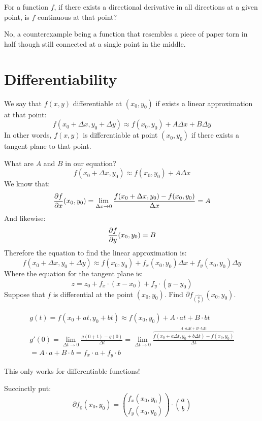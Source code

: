 \documentclass[00_complete]{subfiles}
\begin{document}
\begin{example}[Question 3]
    For a function $f$, if there exists a directional derivative in all
    directions at a given point, is $f$ continuous at that point?
    \begin{conclusion}
        No, a counterexample being a function that resembles a piece of paper
        torn in half though still connected at a single point in the middle.
    \end{conclusion}
\end{example}
\section{Differentiability}
\begin{definition}[Differentiability]
   We say that $f(x,y)$ differentiable at $(x_0,y_0)$ if exists a linear
   approximation at that point:
   $$f(x_0+\Delta x,y_0+\Delta y) \approx f(x_0,y_0)+A \Delta x + B \Delta y$$
   In other words, $f(x,y)$ is differentiable at point $(x_0,y_0)$ if there
   exists a tangent plane to that point.
\end{definition}
What are $A$ and $B$ in our equation?
$$f(x_0+\Delta x,y_0) \approx f(x_0,y_0) + A\Delta x$$
We know that:
$$\pdv{f}{x}\/(x_0,y_0) = \lim\limits_{\Delta x \to 0} \frac{f(x_0+\Delta
x,y_0)-f(x_0,y_0)}{\Delta x} =A$$
And likewise:
$$\pdv{f}{y}\/(x_0,y_0) = B$$
Therefore the equation to find the linear approximation is:
$$
    f(x_0+\Delta x,y_0 + \Delta y) \approx f(x_0,y_0) + f_x(x_0,y_0)\Delta x +
    f_y(x_0,y_0)\Delta y
$$
Where the equation for the tangent plane is:
$$
    z=z_0+f_x\cdot (x-x_0)+f_y \cdot (y-y_0)
$$
Suppose that $f$ is differential at the point $(x_0,y_0)$. Find $\partial
f_{\hat{\underline{\binom{a}{b}}}}(x_0,y_0)$.

\begin{gather*}
    g(t)=f(x_0+at,y_0+bt) \approx f(x_0,y_0) + A\cdot at + B \cdot bt \\
    g'(0) = \lim\limits_{\Delta t \to 0} \frac{g(0+t)-g(0)}{\Delta t} =
    \lim\limits_{\Delta t \to 0} \frac{\overbrace{f(x_0+a\Delta t,y_0+b\Delta
    t)-f(x_0,y_0)}^{A\cdot a\Delta t + B\cdot b \Delta t}}{\Delta t} \\
    =A\cdot a + B \cdot b =\boxed{f_x\cdot a + f_y \cdot b}
\end{gather*}
\begin{note}
    This only works for differentiable functions!
\end{note}
Succinctly put:
$$\partial f_{\hat{\underline e}}(x_0,y_0) =
\binom{f_x(x_0,y_0)}{f_y(x_0,y_0)}\cdot \binom{a}{b}$$
\end{document}
